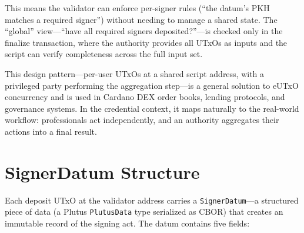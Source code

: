 This means the validator can enforce per-signer rules (``the datum's PKH
matches a required signer'') without needing to manage a shared state.
The ``global'' view---``have all required signers deposited?''---is checked
only in the finalize transaction, where the authority provides all UTxOs as
inputs and the script can verify completeness across the full input set.

This design pattern---per-user UTxOs at a shared script address, with a
privileged party performing the aggregation step---is a general solution
to eUTxO concurrency and is used in Cardano DEX order books, lending
protocols, and governance systems.  In the credential context, it maps
naturally to the real-world workflow: professionals act independently,
and an authority aggregates their actions into a final result.


\section{SignerDatum Structure}
\label{sec:signer-datum}

Each deposit UTxO at the validator address carries a \texttt{SignerDatum}---a
structured piece of data (a Plutus \texttt{PlutusData} type serialized as
CBOR) that creates an immutable record of the signing act.  The datum
contains five fields:

